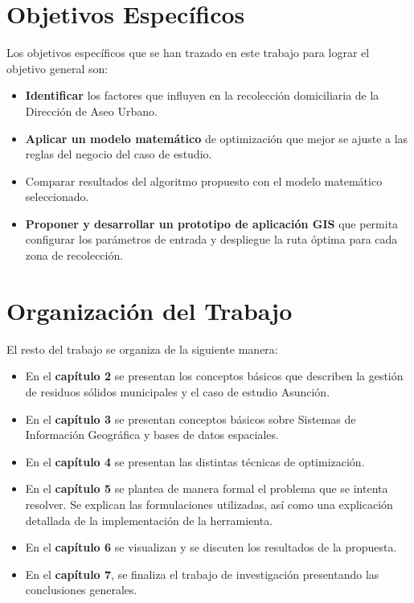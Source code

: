 \section{Objetivos Específicos}

Los objetivos específicos que se han trazado en este trabajo para lograr el objetivo general son:
\begin{itemize}
    \item \textbf{Identificar} los factores que influyen en la recolección domiciliaria de la Dirección de Aseo Urbano.
    \item \textbf{Aplicar un modelo matemático} de optimización que mejor se ajuste a las reglas del negocio del caso de estudio.
    \item Comparar resultados del algoritmo propuesto con el modelo matemático seleccionado.
    \item \textbf{Proponer y desarrollar un prototipo de aplicación GIS} que permita configurar los parámetros de entrada y despliegue la ruta óptima para cada zona de recolección.
\end{itemize}


\section{Organización del Trabajo}

El resto del trabajo se organiza de la siguiente manera:

\begin{itemize}
    \item En el \textbf{capítulo 2} se presentan los conceptos básicos que describen la gestión de residuos sólidos municipales y el caso de estudio Asunción.
    \item En el \textbf{capítulo 3} se presentan conceptos básicos sobre Sistemas de Información Geográfica y bases de datos espaciales.
    \item En el \textbf{capítulo 4} se presentan las distintas técnicas de optimización.    
    \item En el \textbf{capítulo 5} se plantea de manera formal el problema que se intenta resolver. Se explican las formulaciones utilizadas, así como una explicación detallada de la implementación de la herramienta. 
    \item En el \textbf{capítulo 6} se visualizan y se discuten los resultados de la propuesta.
    \item En el \textbf{capítulo 7}, se finaliza el trabajo de investigación presentando las conclusiones generales.    
\end{itemize}